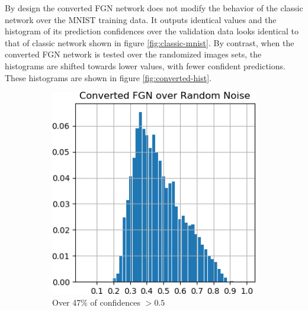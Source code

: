 \documentclass[12pt,oneside]{CUNY_PhD}
\begin{document}
\newpage%

By design the converted FGN network does not modify the behavior of the classic network over the MNIST training data. It outputs identical values and the histogram of its prediction confidences over the validation data looks identical to that of classic network shown in figure \ref{fig:classic-mnist}. By contrast, when the converted FGN network is tested over the randomized images sets, the histograms are shifted towards lower values, with fewer confident predictions. These histograms are shown in figure \ref{fig:converted-hist}.
\begin{figure}[!h]
    \centering
    \begin{subfigure}[t]{0.49\textwidth}
        \includegraphics[width=\textwidth]{images/mnist-behavior/converted-hist-random.png}
        \caption*{Over 47\% of confidences $>0.5$}
    \end{subfigure}
    \begin{subfigure}[t]{0.49\textwidth}

\end{subfigure}
\end{figure}
\end{document}
